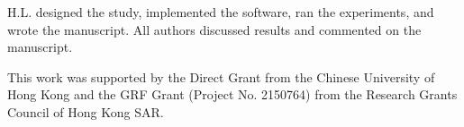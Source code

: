 \documentclass[twocolumn]{svjour3}          %
\begin{document}
H.L. designed the study, implemented the software, ran the experiments, and wrote the manuscript. All authors discussed results and commented on the manuscript.

\begin{acknowledgements}

This work was supported by the Direct Grant from the Chinese University of Hong Kong and the GRF Grant (Project No. 2150764) from the Research Grants Council of Hong Kong SAR.

\end{acknowledgements}

\end{document}
